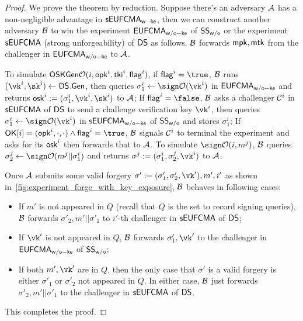 \begin{proof}
We prove the theorem by reduction. Suppose there's an adversary $\mathcal{A}$ has a non-negligible advantage in $\mathsf{sEUFCMA}_\mathsf{w-ke}$, then we can construct another adversary $\mathcal{B}$ to win the experiment $\mathsf{EUFCMA}_\mathsf{w/o-ke}$ of $\mathsf{SS}_\mathsf{w/o}$ or the experiment $\mathsf{sEUFCMA}$ (strong unforgeability) of $\mathsf{DS}$ as follows. $\mathcal{B}$ forwards $\mathsf{mpk},\mathsf{mtk}$ from the challenger in $\mathsf{EUFCMA}_\mathsf{w/o-ke}$ to $\mathcal{A}$. 

To simulate $\mathsf{OSKGen}\mathcal{O}(i,\mathsf{opk}^i,\mathsf{tki}^i,\mathsf{flag}^i)$, if $\flag^i=\true$, $\mathcal{B}$ runs $(\vk^i,\sk^i)\gets\DS.\gen$, then queries $\sigma^i_1\gets\sign\Oc(\vk^i)$ in $\mathsf{EUFCMA}_\mathsf{w/o-ke}$ and returns $\osk^i:=(\sigma^i_1,\vk^i,\sk^i)$ to $\mathcal{A}$; If $\flag^i=\false$, $\mathcal{B}$ asks a challenger $\mathcal{C}^i$ in $\mathsf{sEUFCMA}$ of $\mathsf{DS}$ to send a challenge verification key $\vk^i$, then queries $\sigma_1^i\gets\sign\Oc(\vk^i)$ in $\mathsf{sEUFCMA}_\mathsf{w/o-ke}$ of $\mathsf{SS}_\mathsf{w/o}$ and stores $\sigma_1^i$; If $\OK[i]=(\opk^i,\cdot,\cdot)\wedge\flag^i=\true$, $\mathcal{B}$ signals $\mathcal{C}^i$ to terminal the experiment and asks for its $\mathsf{osk}^i$ then forwards that to $\mathcal{A}$.
To simulate $\sign\Oc(i,m^j)$, $\mathcal{B}$ queries $\sigma_2^j\gets\sign\Oc(m^j||\sigma_1^i)$ and returns $\sigma^j:=(\sigma_1^i,\sigma_2^j,\vk^i)$ to $\mathcal{A}$. 

Once $\mathcal{A}$ submits some valid forgery $\sigma':=(\sigma'_1,\sigma'_2,\vk'),m',i'$ as shown in~\cref{fig:experiment_forge_with_key_exposure}, $\mathcal{B}$ behaves in following cases:
\begin{itemize}
    \item If $m'$ is not appeared in $Q$ (recall that $Q$ is the set to record signing queries), $\mathcal{B}$ forwards $\sigma'_2, m'||\sigma'_1$ to $i'$-th challenger in $\mathsf{sEUFCMA}$ of $\mathsf{DS}$;
    \item If $\vk'$ is not appeared in $Q$, $\mathcal{B}$ forwards $\sigma'_1, \vk'$ to the challenger in $\mathsf{EUFCMA}_\mathsf{w/o-ke}$ of $\mathsf{SS}_\mathsf{w/o}$;
    \item If both $m',\vk'$ are in $Q$, then the only case that $\sigma'$ is a valid forgery is either $\sigma'_1$ or $\sigma'_2$ not appeared in $Q$. In either case, $\mathcal{B}$ just forwards $\sigma'_2, m'||\sigma'_1$ to the challenger in $\mathsf{sEUFCMA}$ of $\mathsf{DS}$. 
\end{itemize}
This completes the proof.

\end{proof}

